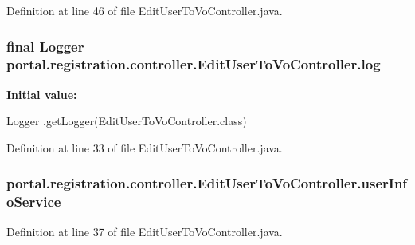 Definition at line 46 of file EditUserToVoController.java.

\hypertarget{classportal_1_1registration_1_1controller_1_1EditUserToVoController_abc91983450be169b71a43139da136573}{
\subsubsection[{log}]{\setlength{\rightskip}{0pt plus 5cm}final Logger {\bf portal.registration.controller.EditUserToVoController.log}}}
\label{classportal_1_1registration_1_1controller_1_1EditUserToVoController_abc91983450be169b71a43139da136573}
{\bfseries Initial value:}
\begin{DoxyCode}
 Logger
                        .getLogger(EditUserToVoController.class)
\end{DoxyCode}


Definition at line 33 of file EditUserToVoController.java.

\hypertarget{classportal_1_1registration_1_1controller_1_1EditUserToVoController_adfc9f529073107272adc85ef5af0ba64}{
\subsubsection[{userInfoService}]{ {\bf portal.registration.controller.EditUserToVoController.userInfoService}}}
\label{classportal_1_1registration_1_1controller_1_1EditUserToVoController_adfc9f529073107272adc85ef5af0ba64}


Definition at line 37 of file EditUserToVoController.java.

